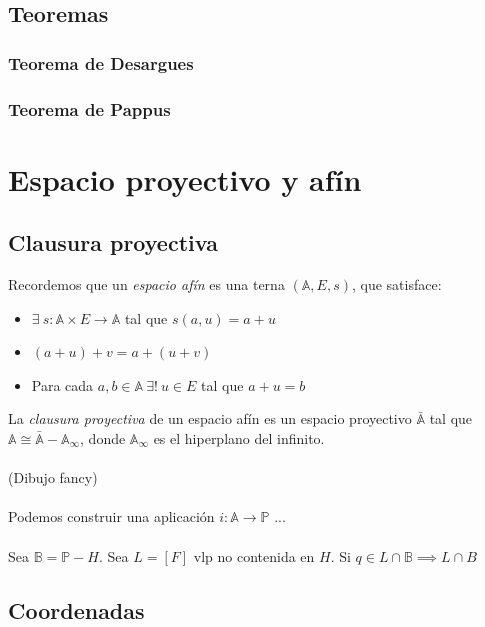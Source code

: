 \documentclass{myclass}
\newcommand{\A}{\mathcal{A}}
\renewcommand{\P}{\mathbb{P}}
\renewcommand{\A}{\mathbb{A}}
\newcommand{\B}{\mathbb{B}}
\begin{document}
\subsection{Teoremas}
\subsubsection{Teorema de Desargues}
\subsubsection{Teorema de Pappus}
 

\section{Espacio proyectivo y afín}
\subsection{Clausura proyectiva}
Recordemos que un \textit{espacio afín} es una terna $(\A, E, s)$, que satisface:
\begin{itemize}
  \item $\exists \ s:\A \times E\to \A$ tal que $s(a, u) = a+u$
  \item $(a+u) + v = a + (u + v)$
  \item Para cada $a, b \in \A \ \exists ! \ u\in E $ tal que $a+ u = b$
\end{itemize}
La \textit{clausura proyectiva} de un espacio afín es un espacio proyectivo $\bar{\A}$ tal que $\A \cong \bar{\A}-\A_\infty$, donde $\A_\infty$ es el hiperplano del infinito. \\
\\
(Dibujo fancy)\\
\\
Podemos construir una aplicación $i: \A \to \P$ ... \\
\\
Sea $\B = \P-H$. Sea $L = [F]$ vlp no contenida en $H$. Si $q\in L\cap \B \implies L\cap B$  

\subsection{Coordenadas}
\end{document}

